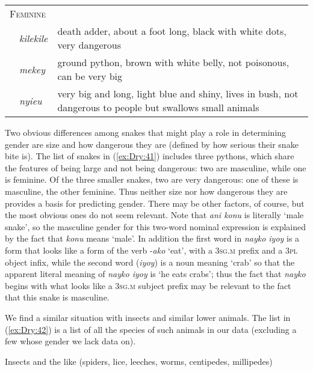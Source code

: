\documentclass[output=collectionpaper]{langsci/langscibook}
\begin{document}
\begin{tabularx}{0.9\textwidth}{lp{1.8cm}X}
\multicolumn{3}{l}{\textsc{Feminine}}\\
  & \textit{kilekile} & death adder, about a foot long, black with white dots, very dangerous\\
& \textit{mekey} & ground python, brown with white belly, not poisonous, can be very big\\
& \textit{nyieu} & very big and long, light blue and shiny, lives in bush, not dangerous to people but swallows small animals\\
\end{tabularx}
\z

Two obvious differences among snakes that might play a role in determining gender are size and how dangerous they are (defined by how serious their snake bite is). The list of snakes in (\ref{ex:Dry:41}) includes three pythons, which share the features of being large and not being dangerous: two are masculine, while one is feminine. Of the three smaller snakes, two are very dangerous: one of these is masculine, the other feminine. Thus neither size nor how dangerous they are provides a basis for predicting gender. There may be other factors, of course, but the most obvious ones do not seem relevant. Note that \textit{ani konu} is literally `male snake', so the masculine gender for this two-word nominal expression is explained by the fact that \textit{konu} means `male'. In addition the first word in \textit{nayko iyoy} is a form that looks like a form of the verb -\textit{ako} `eat', with a \textsc{3sg.m} prefix and a \textsc{3pl} object infix, while the second word (\textit{iyoy}) is a noun meaning `crab' so that the apparent literal meaning of \textit{nayko iyoy} is `he eats crabs'; thus the fact that \textit{nayko} begins with what looks like a \textsc{3sg.m} subject prefix may be relevant to the fact that this snake is masculine.

We find a similar situation with insects and similar lower animals. The list in (\ref{ex:Dry:42}) is a list of all the species of such animals in our data (excluding a few whose gender we lack data on).

\ea    \label{ex:Dry:42}
Insects and the like (spiders, lice, leeches, worms, centipedes, millipedes)\\
\end{document}
